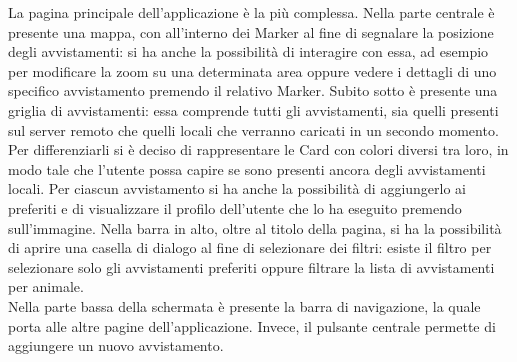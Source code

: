 \documentclass[a4paper,final,12pt]{report}
\begin{document}
La pagina principale dell'applicazione è la più complessa. Nella parte centrale è presente una mappa, con all'interno dei Marker al fine di segnalare la posizione degli avvistamenti: si ha anche la possibilità di interagire con essa, ad esempio per modificare la zoom su una determinata area oppure vedere i dettagli di uno specifico avvistamento premendo il relativo Marker. Subito sotto è presente una griglia di avvistamenti: essa comprende tutti gli avvistamenti, sia quelli presenti sul server remoto che quelli locali che verranno caricati in un secondo momento. Per differenziarli si è deciso di rappresentare le Card con colori diversi tra loro, in modo tale che l'utente possa capire se sono presenti ancora degli avvistamenti locali. Per ciascun avvistamento si ha anche la possibilità di aggiungerlo ai preferiti e di visualizzare il profilo dell'utente che lo ha eseguito premendo sull'immagine.
Nella barra in alto, oltre al titolo della pagina, si ha la possibilità di aprire una casella di dialogo al fine di selezionare dei filtri: esiste il filtro per selezionare solo gli avvistamenti preferiti oppure filtrare la lista di avvistamenti per animale.\\
Nella parte bassa della schermata è presente la barra di navigazione, la quale porta alle altre pagine dell'applicazione. Invece, il pulsante centrale permette di aggiungere un nuovo avvistamento.
\end{document}
